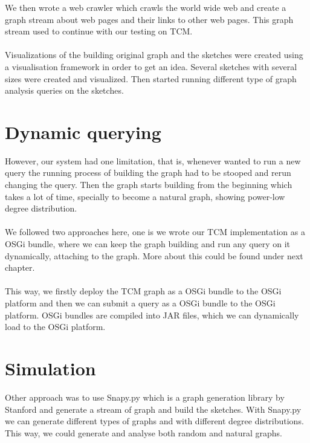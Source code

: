 \documentclass[12pt]{report}
\numberwithin{figure}{section}
\numberwithin{table}{section}
\begin{document}
We then wrote a web crawler which crawls the world wide web and create a graph stream about web pages and their links to other web pages. This graph stream used to continue with our testing on TCM. 

\paragraph{}

Visualizations of the building original graph and the sketches were created using a visualisation framework in order to get an idea. Several sketches with several sizes were created and visualized. Then started running different type of graph analysis queries on the sketches. 

\section{Dynamic querying}

However, our system had one limitation, that is, whenever wanted to run a new query the running process of building the graph had to be stooped and rerun changing the query. Then the graph starts building from the beginning which takes a lot of time, specially to become a  natural graph, showing power-low degree distribution. 

\paragraph{}

We followed two approaches here, one is we wrote our TCM implementation as a OSGi bundle, where we can keep the graph building and run any query on it dynamically, attaching to the graph. More about this could be found under next chapter. 

\paragraph{}

This way, we firstly deploy the TCM graph as a OSGi bundle to the OSGi platform and then we can submit a query as a OSGi bundle to the OSGi platform. OSGi bundles are compiled into JAR files, which we can dynamically load to the OSGi platform. 

\section{Simulation}

Other approach was to use Snapy.py which is a graph generation library by Stanford and generate a stream of graph and build the sketches.  With Snapy.py we can generate different types of graphs and with different degree distributions. This way, we could generate and analyse both random and natural graphs.
\end{document}
